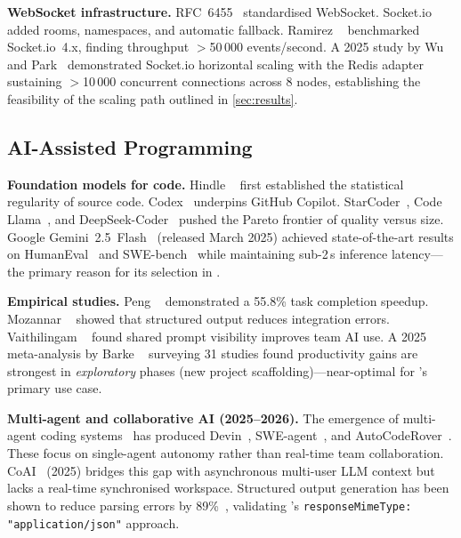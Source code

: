 \textbf{WebSocket infrastructure.}
RFC~6455~\cite{rfc6455} standardised WebSocket. Socket.io~\cite{socketio2024}
added rooms, namespaces, and automatic fallback. Ramirez \etal~\cite{ramirez2023benchmark}
benchmarked Socket.io~4.x, finding throughput $>$50\,000 events/second. A 2025
study by Wu and Park~\cite{wu2025scaling} demonstrated Socket.io horizontal
scaling with the Redis adapter sustaining $>$10\,000 concurrent connections
across 8 nodes, establishing the feasibility of the scaling path outlined in
\cref{sec:results}.

\subsection{AI-Assisted Programming}
\label{sub:aicode}

\textbf{Foundation models for code.}
Hindle \etal~\cite{hindle2012naturalness} first established the statistical
regularity of source code. Codex~\cite{chen2021evaluating} underpins GitHub
Copilot. StarCoder~\cite{li2023starcoder}, Code Llama~\cite{roziere2023codellama},
and DeepSeek-Coder~\cite{guo2024deepseek} pushed the Pareto frontier of
quality versus size. Google Gemini~2.5~Flash~\cite{gemini25flash2025}
(released March 2025) achieved state-of-the-art results on
HumanEval~\cite{chen2021evaluating} and SWE-bench~\cite{jimenez2024swebench}
while maintaining sub-2\,s inference latency---the primary reason for its
selection in \echoray{}.

\textbf{Empirical studies.}
Peng \etal~\cite{peng2023impact} demonstrated a 55.8\% task completion
speedup. Mozannar \etal~\cite{mozannar2024reading} showed that structured
output reduces integration errors. Vaithilingam \etal~\cite{vaithilingam2022expectation}
found shared prompt visibility improves team AI use. A 2025 meta-analysis by
Barke \etal~\cite{barke2025meta} surveying 31 studies found productivity gains
are strongest in \emph{exploratory} phases (new project scaffolding)---near-optimal
for \echoray{}'s primary use case.

\textbf{Multi-agent and collaborative AI (2025--2026).}
The emergence of multi-agent coding systems~\cite{wang2024survey} has produced
Devin~\cite{cognition2024devin}, SWE-agent~\cite{yang2024sweagent}, and
AutoCodeRover~\cite{zhang2024autocoderover}. These focus on single-agent
autonomy rather than real-time team collaboration. CoAI~\cite{huang2025coai}
(2025) bridges this gap with asynchronous multi-user LLM context but lacks a
real-time synchronised workspace. Structured output generation has been shown
to reduce parsing errors by 89\%~\cite{beurer2025structured}, validating
\echoray{}'s \texttt{responseMimeType: "application/json"} approach.

